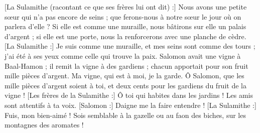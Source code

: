 \begin{multicols}{2}
[La Sulamithe (racontant ce que ses frères lui ont dit) :] Nous avons une petite sœur qui n'a pas encore de seins ; que ferons-nous à notre sœur le jour où on parlera d’elle ?
Si elle est comme une muraille, nous bâtirons sur elle un palais d'argent ; si elle est une porte, nous la renforcerons avec une planche de cèdre.
[La Sulamithe :] Je suis comme une muraille, et mes seins sont comme des tours ; j'ai été à ses yeux comme celle qui trouve la paix.
Salomon avait une vigne à Baal-Hamon ; il remit la vigne à des gardiens ; chacun apportait pour son fruit mille pièces d'argent.
Ma vigne, qui est à moi, je la garde. Ô Salomon, que les mille pièces d'argent soient à toi, et deux cents pour les gardiens du fruit de la vigne !
[Les frères de la Sulamithe :] Ô toi qui habites dans les jardins ! Les amis sont attentifs à ta voix. [Salomon :] Daigne me la faire entendre !
[La Sulamithe :] Fuis, mon bien-aimé ! Sois semblable à la gazelle ou au faon des biches, sur les montagnes des aromates !
\PPE{}
\end{multicols}